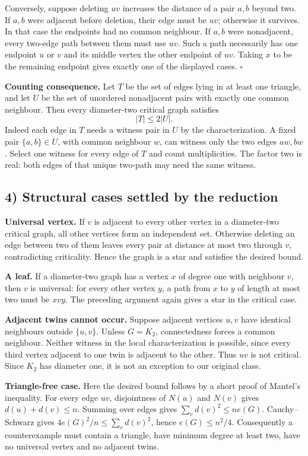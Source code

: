 Conversely, suppose deleting $uv$ increases the distance of a pair $a,b$ beyond two. If $a,b$ were adjacent before deletion, their edge must be $uv$; otherwise it survives. In that case the endpoints had no common neighbour. If $a,b$ were nonadjacent, every two-edge path between them must use $uv$. Such a path necessarily has one endpoint $u$ or $v$ and its middle vertex the other endpoint of $uv$. Taking $x$ to be the remaining endpoint gives exactly one of the displayed cases. $\square$

\textbf{Counting consequence.} Let $T$ be the set of edges lying in at least one triangle, and let $U$ be the set of unordered nonadjacent pairs with exactly one common neighbour. Then every diameter-two critical graph satisfies
\[
 |T|\leq2|U|.
\]
Indeed each edge in $T$ needs a witness pair in $U$ by the characterization. A fixed pair $\{a,b\}\in U$, with common neighbour $w$, can witness only the two edges $aw,bw$. Select one witness for every edge of $T$ and count multiplicities. The factor two is real: both edges of that unique two-path may need the same witness.

\subsection*{4) Structural cases settled by the reduction}
\textbf{Universal vertex.} If $v$ is adjacent to every other vertex in a diameter-two critical graph, all other vertices form an independent set. Otherwise deleting an edge between two of them leaves every pair at distance at most two through $v$, contradicting criticality. Hence the graph is a star and satisfies the desired bound.

\textbf{A leaf.} If a diameter-two graph has a vertex $x$ of degree one with neighbour $v$, then $v$ is universal: for every other vertex $y$, a path from $x$ to $y$ of length at most two must be $xvy$. The preceding argument again gives a star in the critical case.

\textbf{Adjacent twins cannot occur.} Suppose adjacent vertices $u,v$ have identical neighbours outside $\{u,v\}$. Unless $G=K_2$, connectedness forces a common neighbour. Neither witness in the local characterization is possible, since every third vertex adjacent to one twin is adjacent to the other. Thus $uv$ is not critical. Since $K_2$ has diameter one, it is not an exception to our original class.

\textbf{Triangle-free case.} Here the desired bound follows by a short proof of Mantel's inequality. For every edge $uv$, disjointness of $N(u)$ and $N(v)$ gives $d(u)+d(v)\leq n$. Summing over edges gives $\sum_v d(v)^2\leq ne(G)$. Cauchy--Schwarz gives $4e(G)^2/n\leq\sum_vd(v)^2$, hence $e(G)\leq n^2/4$. Consequently a counterexample must contain a triangle, have minimum degree at least two, have no universal vertex and no adjacent twins.

